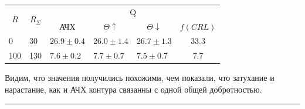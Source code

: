 \documentclass[a4paper,12pt]{article} %
\begin{document}
\begin{center}
\begin{tabular}{|l|l|cccc|}
\hline
\multicolumn{1}{|c|}{\multirow{2}{*}{$R$}} & \multicolumn{1}{c|}{\multirow{2}{*}{$R_\Sigma$}} & \multicolumn{4}{c|}{Q}                                                                                                  \\ \cline{3-6} 
\multicolumn{1}{|c|}{}                     & \multicolumn{1}{c|}{}                            & \multicolumn{1}{c|}{АЧХ} & \multicolumn{1}{c|}{$\Theta \uparrow$} & \multicolumn{1}{c|}{$\Theta \downarrow$} & $f(CRL)$ \\ \hline
0                                          & 30                                               & \multicolumn{1}{l|}{$26.9\pm0.4$}   & \multicolumn{1}{l|}{$26.0 \pm 1.4$}                 & \multicolumn{1}{l|}{$26.7 \pm 1.3$}                   & $33.3 $       \\ \hline
100                                        & 130                                              & \multicolumn{1}{l|}{$7.6\pm0.2$}   & \multicolumn{1}{l|}{$7.7 \pm 0.7$}                 & \multicolumn{1}{l|}{$7.5 \pm 0.7$}                   & $7.7$        \\ \hline
\end{tabular}
\end{center}

Видим, что значения получились похожими, чем показали, что затухание и нарастание, как и АЧХ контура связанны с одной общей добротностью.

\medskip\hrule\medskip
\end{document}
